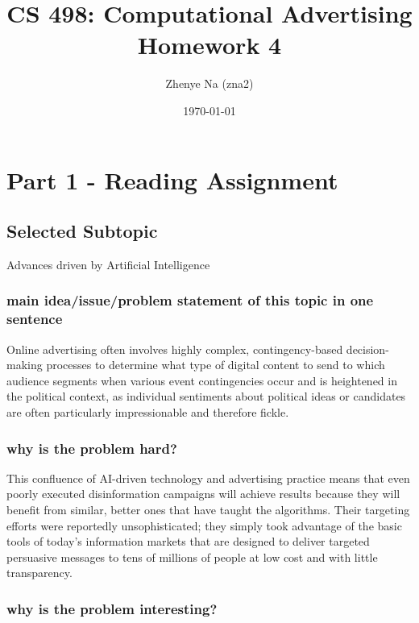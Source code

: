 \documentclass[12pt]{article}%
\begin{document}
\title{CS 498: Computational Advertising \\
       Homework 4}
\author{Zhenye Na (zna2)}
\date{\today}
\maketitle



\section{Part 1 - Reading Assignment}


\subsection{Selected Subtopic}

Advances driven by Artificial Intelligence

\subsubsection{main idea/issue/problem statement of this topic in one sentence}

Online advertising often involves highly complex, contingency-based decision-making processes to determine what type of digital content to send to which audience segments when various event contingencies occur and is heightened in the political context, as individual sentiments about political ideas or candidates are often particularly impressionable and therefore fickle.

\subsubsection{why is the problem hard?}

This confluence of AI-driven technology and advertising practice means that even poorly executed disinformation campaigns will achieve results because they will benefit from similar, better ones that have taught the algorithms. Their targeting efforts were reportedly unsophisticated; they simply took advantage of the basic tools of today’s information markets that are designed to deliver targeted persuasive messages to tens of millions of people at low cost and with little transparency.

\subsubsection{why is the problem interesting?}
\end{document}
